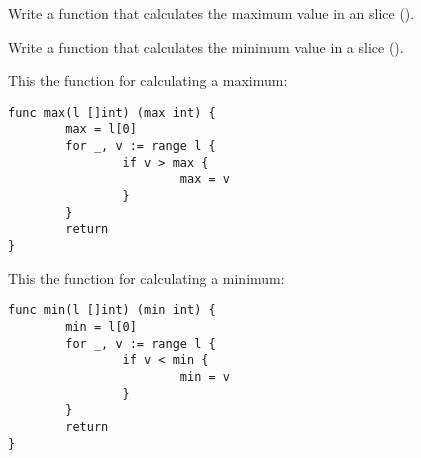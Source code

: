 \begin{Exercise}[title={Minimum and maximum},difficulty=3]
\label{ex:minmax}
\Question\label{ex:minmax q1} Write a function that calculates the
maximum value in an  slice ().

\Question\label{ex:minmax q2} Write a function that calculates the
minimum value in a  slice ().

\end{Exercise}

\begin{Answer}
\Question This the function for calculating a maximum:
\begin{lstlisting}
func max(l []int) (max int) {
        max = l[0]
        for _, v := range l { 
                if v > max {
                        max = v 
                }   
        }   
        return
}
\end{lstlisting}

\Question This the function for calculating a minimum:
\begin{lstlisting}
func min(l []int) (min int) {
        min = l[0]
        for _, v := range l { 
                if v < min {
                        min = v 
                }   
        }   
        return
}
\end{lstlisting}
\end{Answer}
